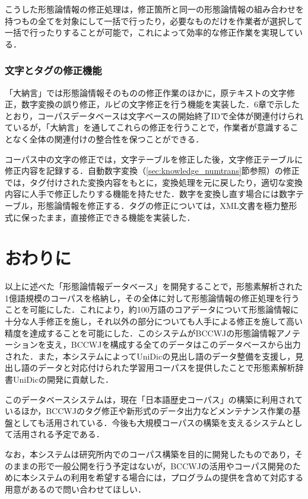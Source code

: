 \documentclass[japanese]{jnlp_1.4}
\begin{document}
こうした形態論情報の修正処理は，修正箇所と同一の形態論情報の組み合わせを持つもの全てを対象にして一括で行ったり，必要なものだけを作業者が選択して一括で行ったりすることが可能で，これによって効率的な修正作業を実現している．


\subsubsection{文字とタグの修正機能}

「大納言」では形態論情報そのものの修正作業のほかに，原テキストの文字修正，数字変換の誤り修正，ルビの文字修正を行う機能を実装した．6章で示したとおり，コーパスデータベースは文字ベースの開始終了IDで全体が関連付けられているが，「大納言」を通してこれらの修正を行うことで，作業者が意識することなく全体の関連付けの整合性を保つことができる．

コーパス中の文字の修正では，文字テーブルを修正した後，文字修正テーブルに修正内容を記録する．自動数字変換（\ref{sec:knowledge_numtrans}節参照）の修正では，タグ付けされた変換内容をもとに，変換処理を元に戻したり，適切な変換内容に人手で修正したりする機能を持たせた．数字を変換し直す場合には数字テーブル，形態論情報を修正する．タグの修正については，XML文書を極力整形式に保ったまま，直接修正できる機能を実装した．


\section{おわりに}

以上に述べた「形態論情報データベース」を開発することで，形態素解析された1億語規模のコーパスを格納し，その全体に対して形態論情報の修正処理を行うことを可能にした．これにより，約100万語のコアデータについて形態論情報に十分な人手修正を施し，それ以外の部分についても人手による修正を施して高い精度を達成することを可能にした．このシステムがBCCWJの形態論情報アノテーションを支え，BCCWJを構成する全てのデータはこのデータベースから出力された．また，本システムによってUniDicの見出し語のデータ整備を支援し，見出し語のデータと対応付けられた学習用コーパスを提供したことで形態素解析辞書UniDicの開発に貢献した．

このデータベースシステムは，現在「日本語歴史コーパス」の構築に利用されているほか，BCCWJのタグ修正や新形式のデータ出力などメンテナンス作業の基盤としても活用されている．今後も大規模コーパスの構築を支えるシステムとして活用される予定である．

なお，本システムは研究所内でのコーパス構築を目的に開発したものであり，そのままの形で一般公開を行う予定はないが，BCCWJの活用やコーパス開発のために本システムの利用を希望する場合には，プログラムの提供を含めて対応する用意があるので問い合わせてほしい．
\end{document}

